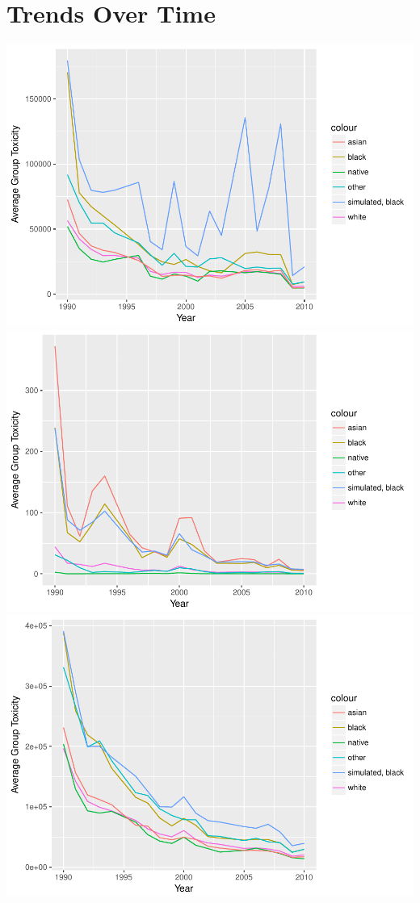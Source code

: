 \documentclass[12pt,twoside]{dukestatscithesis}
\theoremstyle{definition}
\theoremstyle{definition}
\theoremstyle{definition}
\theoremstyle{remark}
\begin{document}
\section{Trends Over Time}\label{trends-over-time}

\includegraphics{thesis_files/figure-latex/unnamed-chunk-4-1.pdf}
\includegraphics{thesis_files/figure-latex/unnamed-chunk-4-2.pdf}
\includegraphics{thesis_files/figure-latex/unnamed-chunk-4-3.pdf}
\end{document}
